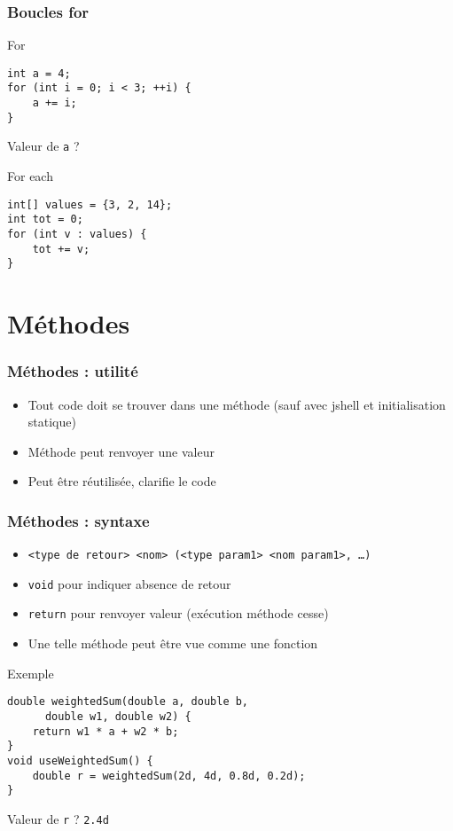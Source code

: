 \documentclass[english, french]{beamer}
\begin{document}
\begin{frame}[fragile]
	\frametitle{Boucles for}
	\begin{block}{For}
		\begin{lstlisting}
int a = 4;
for (int i = 0; i < 3; ++i) {
	a += i;
}
		\end{lstlisting}	
	\end{block}
	Valeur de \texttt{a} ? \onslide<2->{\texttt{7}}
	\begin{block}{For each}
		\begin{lstlisting}
int[] values = {3, 2, 14};
int tot = 0;
for (int v : values) {
	tot += v;
}
		\end{lstlisting}	
	\end{block}
\end{frame}

\section{Méthodes}
\begin{frame}[fragile]
	\frametitle{Méthodes : utilité}
	\begin{itemize}
		\item Tout code doit se trouver dans une méthode {\tiny (sauf avec jshell et initialisation statique)}
		\item Méthode peut renvoyer une valeur
		\item Peut être réutilisée, clarifie le code
	\end{itemize}
\end{frame}

\begin{frame}[fragile]
	\frametitle{Méthodes : syntaxe}
	\begin{itemize}
		\item \texttt{<type de retour> <nom> (<type param1> <nom param1>, …)}
		\item \texttt{void} pour indiquer absence de retour
		\item \texttt{return} pour renvoyer valeur (exécution méthode cesse)
		\item Une telle méthode peut être vue comme une fonction
	\end{itemize}
	\begin{block}{Exemple}
		\begin{lstlisting}[tabsize=1]
double weightedSum(double a, double b, 
      double w1, double w2) {
	return w1 * a + w2 * b;
}
void useWeightedSum() {
	double r = weightedSum(2d, 4d, 0.8d, 0.2d);
}
		\end{lstlisting}	
	\end{block}
	Valeur de \texttt{r} ? \pause \texttt{2.4d}
\end{frame}
\end{document}
